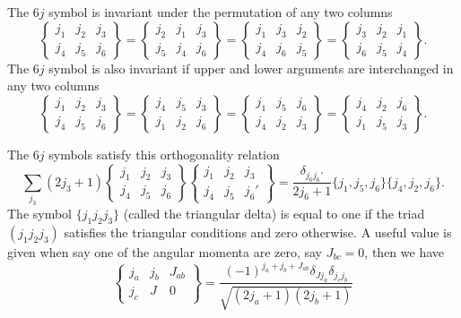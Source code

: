 The $6j$ symbol is invariant under the permutation of any two columns
\[
    \begin{Bmatrix} j_1 & j_2 & j_3\\ j_4 & j_5 & j_6 \end{Bmatrix} = \begin{Bmatrix} j_2 & j_1 & j_3\\ j_5 & j_4 & j_6 \end{Bmatrix} = \begin{Bmatrix} j_1 & j_3 & j_2\\ j_4 & j_6 & j_5 \end{Bmatrix} = \begin{Bmatrix} j_3 & j_2 & j_1\\ j_6 & j_5 & j_4 \end{Bmatrix}. 
\]
The $6j$ symbol is also invariant if upper and lower arguments are interchanged in any two columns
\[
    \begin{Bmatrix} j_1 & j_2 & j_3\\ j_4 & j_5 & j_6 \end{Bmatrix} = \begin{Bmatrix} j_4 & j_5 & j_3\\ j_1 & j_2 & j_6 \end{Bmatrix} = \begin{Bmatrix} j_1 & j_5 & j_6\\ j_4 & j_2 & j_3 \end{Bmatrix} = \begin{Bmatrix} j_4 & j_2 & j_6\\ j_1 & j_5 & j_3 \end{Bmatrix}. 
\]

The $6j$ symbols satisfy this orthogonality relation
\[
    \sum_{j_3} (2j_3+1) \begin{Bmatrix} j_1 & j_2 & j_3\\ j_4 & j_5 & j_6 \end{Bmatrix} \begin{Bmatrix} j_1 & j_2 & j_3\\ j_4 & j_5 & j_6' \end{Bmatrix} = \frac{\delta_{j_6^{}j_6'}}{2j_6+1} \{j_1,j_5,j_6\} \{j_4,j_2,j_6\}. 
\]
The symbol $\{j_1j_2j_3\}$ (called the triangular delta) is equal to one if the triad $(j_1j_2j_3)$ satisfies the triangular conditions and zero otherwise.
A useful value is given when say one of the angular momenta are zero, say $J_{bc}=0$, then we have
\[
\left\{\begin{array}{ccc} j_a & j_b& J_{ab} \\ j_c & J & 0 \end{array}\right\}=\frac{(-1)^{j_a+j_b+J_{ab}}\delta_{Jj_a}\delta_{j_cj_b} }{\sqrt{(2j_{a}+1)(2j_{b}+1)}}
\]

